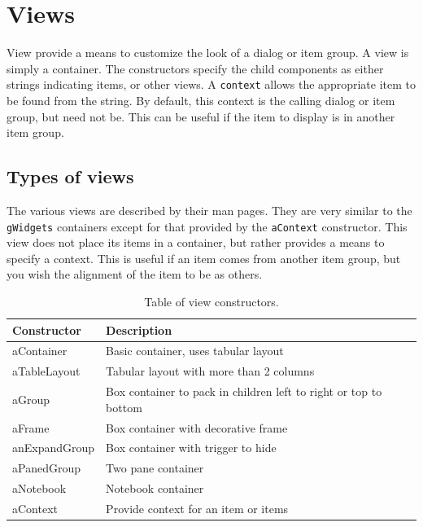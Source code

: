 \documentclass{article}
\newcommand{\code}[1]{\texttt{#1}} %
\newcommand{\function}[1]{\code{#1}} %
\newcommand{\constructor}[1]{\function{#1}\index{#1}}
\newcommand{\args}[1]{\code{#1}} %
\newcommand{\pkg}[1]{\texttt{#1}}
\begin{document}
\section{Views}
\label{sec:views-1}

View provide a means to customize the look of a dialog or item
group. A view is simply a container. The constructors specify the
child components as either strings indicating items, or other views. A
\args{context} allows the appropriate item to be found from the
string. By default, this context is the calling dialog or item group,
but need not be. This can be useful if the item to display is in
another item group.

\subsection{Types of views}
\label{sec:types-views}

The various views are described by their man pages. They are very
similar to the \pkg{gWidgets} containers except for that provided by
the \constructor{aContext} constructor. This view does not place its items in a
container, but rather provides a means to specify a context. This is
useful if an item comes from another item group, but you wish the
alignment of the item to be as others.

\begin{table}
\centering
\label{tab:view-constructors}
\caption{Table of view constructors.}
\begin{tabular}{@{}lp{}@{}}
\toprule

Constructor&Description\\
\midrule
aContainer&Basic container, uses tabular layout\\aTableLayout&Tabular layout with more than 2 columns\\aGroup&Box container to pack in children left to right or top to bottom\\aFrame&Box container with decorative frame\\anExpandGroup&Box container with trigger to hide\\aPanedGroup&Two pane container\\aNotebook&Notebook container\\aContext&Provide context for an item or items
\\ \bottomrule
\end{tabular}
\end{table}
\end{document}
